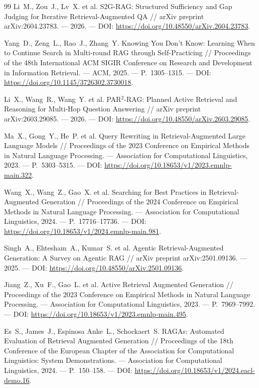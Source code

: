 \documentclass{misisarticle}
\begin{document}
\begin{thebibliography}{99}
 Li~M., Zou~J., Lv~X. et al. S2G-RAG: Structured Sufficiency and Gap Judging for Iterative Retrieval-Augmented QA // arXiv preprint arXiv:2604.23783. — 2026. — DOI: \url{https://doi.org/10.48550/arXiv.2604.23783}.

 Yang~D., Zeng~L., Rao~J., Zhang~Y. Knowing You Don’t Know: Learning When to Continue Search in Multi-round RAG through Self-Practicing // Proceedings of the 48th International ACM SIGIR Conference on Research and Development in Information Retrieval. — ACM, 2025. — P.~1305–1315. — DOI: \url{https://doi.org/10.1145/3726302.3730018}.

 Li~X., Wang~R., Wang~Y. et al. PAR$^2$-RAG: Planned Active Retrieval and Reasoning for Multi-Hop Question Answering // arXiv preprint arXiv:2603.29085. — 2026. — DOI: \url{https://doi.org/10.48550/arXiv.2603.29085}.

 Ma~X., Gong~Y., He~P. et al. Query Rewriting in Retrieval-Augmented Large Language Models // Proceedings of the 2023 Conference on Empirical Methods in Natural Language Processing. — Association for Computational Linguistics, 2023. — P.~5303–5315. — DOI: \url{https://doi.org/10.18653/v1/2023.emnlp-main.322}.

 Wang~X., Wang~Z., Gao~X. et al. Searching for Best Practices in Retrieval-Augmented Generation // Proceedings of the 2024 Conference on Empirical Methods in Natural Language Processing. — Association for Computational Linguistics, 2024. — P.~17716–17736. — DOI: \url{https://doi.org/10.18653/v1/2024.emnlp-main.981}.

 Singh~A., Ehtesham~A., Kumar~S. et al. Agentic Retrieval-Augmented Generation: A Survey on Agentic RAG // arXiv preprint arXiv:2501.09136. — 2025. — DOI: \url{https://doi.org/10.48550/arXiv.2501.09136}.

 Jiang~Z., Xu~F., Gao~L. et al. Active Retrieval Augmented Generation // Proceedings of the 2023 Conference on Empirical Methods in Natural Language Processing. — Association for Computational Linguistics, 2023. — P.~7969–7992. — DOI: \url{https://doi.org/10.18653/v1/2023.emnlp-main.495}.

 Es~S., James~J., Espinosa Anke~L., Schockaert~S. RAGAs: Automated Evaluation of Retrieval Augmented Generation // Proceedings of the 18th Conference of the European Chapter of the Association for Computational Linguistics: System Demonstrations. — Association for Computational Linguistics, 2024. — P.~150–158. — DOI: \url{https://doi.org/10.18653/v1/2024.eacl-demo.16}.


\end{thebibliography}
\end{document}
